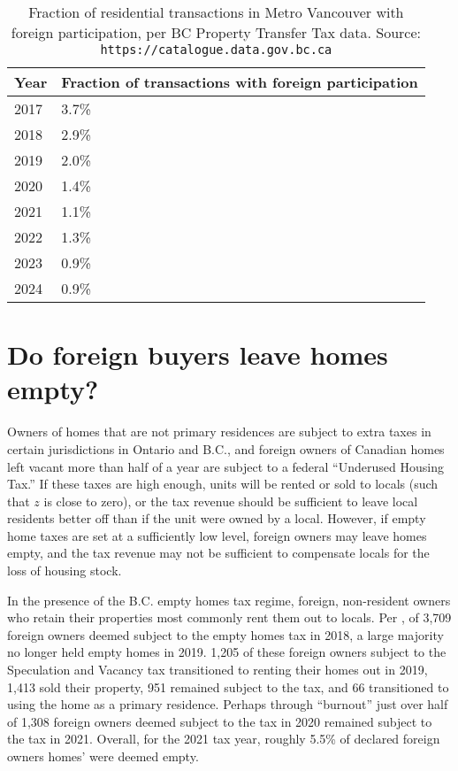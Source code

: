 \documentclass[12pt]{article}
\begin{document}
\begin{table}
	\caption{\label{tab:fbt} Fraction of residential transactions in Metro Vancouver with foreign participation, per BC Property Transfer Tax data. Source: \texttt{https://catalogue.data.gov.bc.ca}}
	\begin{tabular}{ll}
		\hline
		Year & Fraction of transactions with foreign participation \\
		\hline\hline
		2017 & 3.7\% \\
		2018 & 2.9\% \\
		2019 & 2.0\%\\
		2020 & 1.4\%\\
		2021 & 1.1\%\\
		2022 & 1.3\%\\
		2023 & 0.9\%\\
		2024 & 0.9\%\\
		\hline
	\end{tabular}
\end{table}

\section{Do foreign buyers leave homes empty?}

Owners of homes that are not primary residences are subject to extra taxes in
certain jurisdictions in Ontario and B.C., and foreign owners of Canadian homes
left vacant more than half of a year are subject to a federal ``Underused
Housing Tax.'' If these taxes are high enough, units will be rented or sold to
locals (such that $z$ is close to zero), or the tax revenue should be
sufficient to leave local residents better off than if the unit were owned by a
local. However, if empty home taxes are set at a sufficiently low level,
foreign owners may leave homes empty, and the tax revenue may not be sufficient
to compensate locals for the loss of housing stock.

In the presence of the B.C. empty homes tax regime, foreign, non-resident
owners who retain their properties most commonly rent them out to locals. Per
\textcite{specTax2019}, of 3,709 foreign owners deemed subject to the empty
homes tax in 2018, a large majority no longer held empty homes in 2019. 1,205
of these foreign owners subject to the Speculation and Vacancy tax transitioned
to renting their homes out in 2019, 1,413 sold their property, 951 remained
subject to the tax, and 66 transitioned to using the home as a primary
residence. Perhaps through ``burnout'' just over half of 1,308 foreign owners
deemed subject to the tax in 2020 remained subject to the tax in 2021. Overall,
for the 2021 tax year, roughly 5.5\% of declared foreign owners homes' were
deemed empty.
\end{document}
